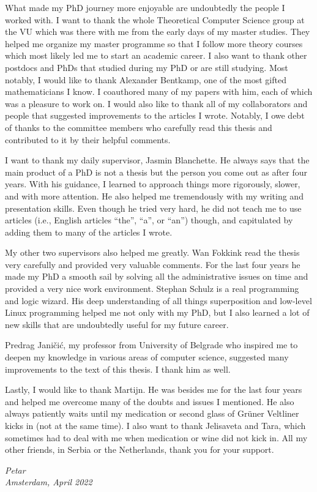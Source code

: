 What made my PhD journey more enjoyable are undoubtedly the people I worked
with. I want to thank the whole Theoretical Computer Science group at the VU
which was there with me from the early days of my master studies. They helped me
organize my master programme so that I follow more theory courses which most
likely led  me to start an academic career. I also want to thank other postdocs
and PhDs that studied during my PhD or are still studying. Most notably, I would
like to thank Alexander Bentkamp, one of the most gifted mathematicians I know.
I coauthored many of my papers with him, each of which was a pleasure to work
on. I would also like to thank all of my collaborators and people that suggested
improvements to the articles I wrote. Notably, I owe debt of thanks to the committee
members who carefully read this thesis and contributed to it by their helpful comments.

I want to thank my daily supervisor, Jasmin Blanchette. He always says that the
main product of a PhD is not a thesis but the person you come out as after four
years. With his guidance, I learned to approach things more rigorously, slower,
and with more attention. He also helped me tremendously  with my writing and
presentation skills. Even though he tried very hard, he did not teach me to use
articles (i.e., English articles ``the'', ``a'', or ``an'') though, and
capitulated by adding them to many of the articles I wrote.

My other two supervisors also helped me greatly. Wan Fokkink read the thesis
very carefully and provided very valuable comments. For the last four years he
made my PhD a smooth sail by solving all the administrative issues on time and
provided a very nice work environment. Stephan Schulz is a real programming and
logic wizard. His deep understanding of all things superposition and low-level
Linux programming helped me not only with my PhD, but I also learned a lot of
new skills that are undoubtedly useful for my future career.

Predrag Jani\v{c}i\'{c}, my professor from University of Belgrade who 
inspired me to deepen my knowledge in various areas of computer science, suggested
many improvements to the text of this thesis. I thank him as well.

Lastly, I would like to thank Martijn. He was besides me for the last four years
and helped me overcome many of the doubts and issues I mentioned. He also always
patiently waits until my medication or second glass of Grüner Veltliner kicks in
(not at the same time). I also want to thank Jelisaveta and Tara, which
sometimes had to deal with me when medication or wine did not kick in. All my other friends,
in Serbia or the Netherlands, thank you for your support.

 

\begin{flushright}
{\makeatletter\itshape
    Petar \\
    Amsterdam, April 2022
\makeatother}
\end{flushright}


